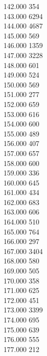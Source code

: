 { 142.000	354 \\
 143.000	6294 \\
 144.000	4687 \\
 145.000	569 \\
 146.000	1359 \\
 147.000	3228 \\
 148.000	601 \\
 149.000	524 \\
 150.000	569 \\
 151.000	277 \\
 152.000	659 \\
 153.000	616 \\
 154.000	600 \\
 155.000	489 \\
 156.000	407 \\
 157.000	657 \\
 158.000	600 \\
 159.000	336 \\
 160.000	645 \\
 161.000	434 \\
 162.000	683 \\
 163.000	606 \\
 164.000	510 \\
 165.000	764 \\
 166.000	297 \\
 167.000	3404 \\
 168.000	580 \\
 169.000	505 \\
 170.000	358 \\
 171.000	625 \\
 172.000	451 \\
 173.000	3399 \\
 174.000	695 \\
 175.000	639 \\
 176.000	555 \\
 177.000	212 \\
}
